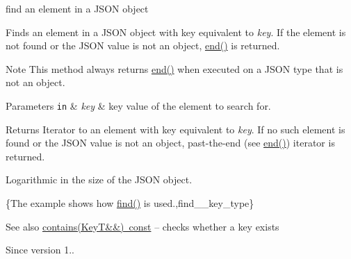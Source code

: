 find an element in a J\+S\+ON object 

Finds an element in a J\+S\+ON object with key equivalent to {\itshape key}. If the element is not found or the J\+S\+ON value is not an object, \mbox{\hyperlink{classnlohmann_1_1basic__json_a13e032a02a7fd8a93fdddc2fcbc4763c}{end()}} is returned.

\begin{DoxyNote}{Note}
This method always returns \mbox{\hyperlink{classnlohmann_1_1basic__json_a13e032a02a7fd8a93fdddc2fcbc4763c}{end()}} when executed on a J\+S\+ON type that is not an object.
\end{DoxyNote}

\begin{DoxyParams}[1]{Parameters}
\mbox{\tt in}  & {\em key} & key value of the element to search for.\\
\hline
\end{DoxyParams}
\begin{DoxyReturn}{Returns}
Iterator to an element with key equivalent to {\itshape key}. If no such element is found or the J\+S\+ON value is not an object, past-\/the-\/end (see \mbox{\hyperlink{classnlohmann_1_1basic__json_a13e032a02a7fd8a93fdddc2fcbc4763c}{end()}}) iterator is returned.
\end{DoxyReturn}
Logarithmic in the size of the J\+S\+ON object.

\{The example shows how {\ttfamily \mbox{\hyperlink{classnlohmann_1_1basic__json_a89eb3928f57903677051c80534be9cb1}{find()}}} is used.,find\+\_\+\+\_\+key\+\_\+type\}

\begin{DoxySeeAlso}{See also}
\mbox{\hyperlink{classnlohmann_1_1basic__json_a9286acdc0578fc66e9346323e69fc0e3}{contains(\+Key\+T\&\&) const}} -- checks whether a key exists
\end{DoxySeeAlso}
\begin{DoxySince}{Since}
version 1.. 
\end{DoxySince}
\mbox{\label{classnlohmann_1_1basic__json_ae625a0647486edf2bb38c849ca67f934}} 
